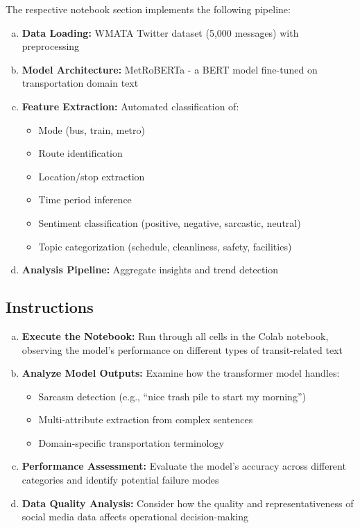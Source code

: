 \documentclass[11pt]{article}
\begin{document}
The respective notebook section implements the following pipeline:
\begin{enumerate}[(a)]
\item \textbf{Data Loading:} WMATA Twitter dataset (5,000 messages) with preprocessing
\item \textbf{Model Architecture:} MetRoBERTa - a BERT model fine-tuned on transportation domain text
\item \textbf{Feature Extraction:} Automated classification of:
\begin{itemize}
\item Mode (bus, train, metro)
\item Route identification
\item Location/stop extraction
\item Time period inference
\item Sentiment classification (positive, negative, sarcastic, neutral)
\item Topic categorization (schedule, cleanliness, safety, facilities)
\end{itemize}
\item \textbf{Analysis Pipeline:} Aggregate insights and trend detection
\end{enumerate}

\subsection*{Instructions}
\begin{enumerate}[(a)]
\item \textbf{Execute the Notebook:} Run through all cells in the Colab notebook, observing the model's performance on different types of transit-related text
\item \textbf{Analyze Model Outputs:} Examine how the transformer model handles:
\begin{itemize}
\item Sarcasm detection (e.g., ``nice trash pile to start my morning'')
\item Multi-attribute extraction from complex sentences
\item Domain-specific transportation terminology
\end{itemize}
\item \textbf{Performance Assessment:} Evaluate the model's accuracy across different categories and identify potential failure modes
\item \textbf{Data Quality Analysis:} Consider how the quality and representativeness of social media data affects operational decision-making
\end{enumerate}
\end{document}
